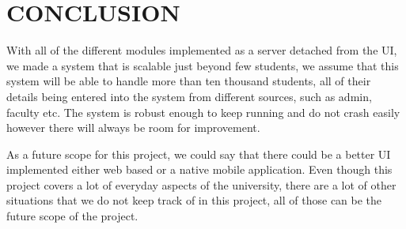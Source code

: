 \section{CONCLUSION}

With all of the different modules implemented as a server detached from the UI,
we made a system that is scalable just beyond few students, we assume that this
system will be able to handle more than ten thousand students, all of their
details being entered into the system from different sources, such as admin,
faculty etc. The system is robust enough to keep running and do not crash easily
however there will always be room for improvement.

As a future scope for this project, we could say that there could be a better UI
implemented either web based or a native mobile application. Even though this
project covers a lot of everyday aspects of the university, there are a lot of
other situations that we do not keep track of in this project, all of those can
be the future scope of the project.

